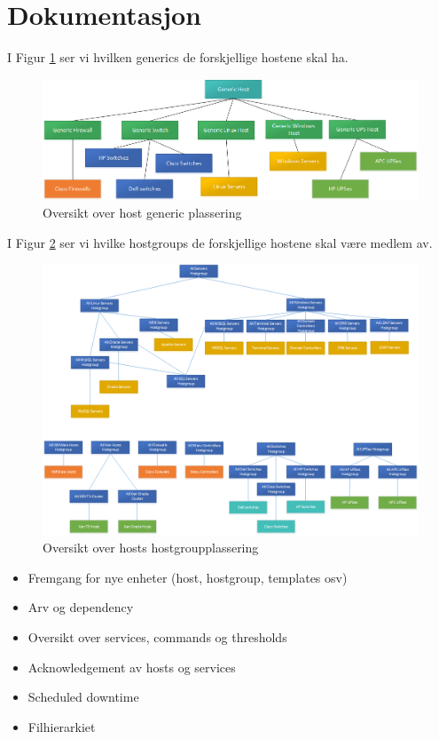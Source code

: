 \section{Dokumentasjon}

I Figur \ref{hostfigur} ser vi hvilken generics de forskjellige hostene skal ha.

\begin{center}
\begin{figure}
    \includegraphics{img/host}
    \caption{Oversikt over host generic plassering}
    \label{hostfigur}
\end{figure}
\end{center}

I Figur \ref{hostgroupfigur} ser vi hvilke hostgroups de forskjellige hostene skal være medlem av.

\begin{center}
\begin{figure}
    \includegraphics{img/hostgroups}
    \caption{Oversikt over hosts hostgroupplassering}
    \label{hostgroupfigur}
\end{figure}
\end{center}


\begin{itemize}
	\item Fremgang for nye enheter (host, hostgroup, templates osv)
        \item Arv og dependency
        \item Oversikt over services, commands og thresholds
        \item Acknowledgement av hosts og services
        \item Scheduled downtime
        \item Filhierarkiet
\end{itemize}
